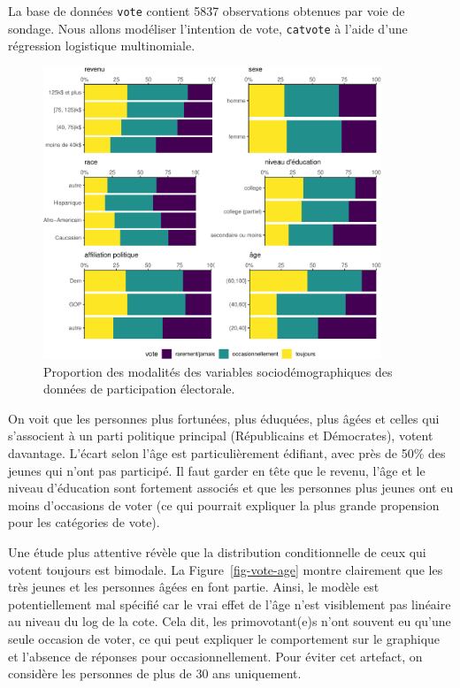 \documentclass[
  11pt,
  letterpaper,
]{scrbook}
\theoremstyle{definition}
\theoremstyle{remark}
\begin{document}
La base de données \texttt{vote} contient 5837 observations obtenues par
voie de sondage. Nous allons modéliser l'intention de vote,
\texttt{catvote} à l'aide d'une régression logistique multinomiale.

\begin{figure}[ht!]

{\centering \includegraphics[width=0.9\textwidth,height=\textheight]{./05-reglogistique_files/figure-pdf/fig-multinom_means-Ipsos-1.pdf}

}

\caption{\label{fig-multinom_means-Ipsos}Proportion des modalités des
variables sociodémographiques des données de participation électorale.}

\end{figure}

On voit que les personnes plus fortunées, plus éduquées, plus âgées et
celles qui s'associent à un parti politique principal (Républicains et
Démocrates), votent davantage. L'écart selon l'âge est particulièrement
édifiant, avec près de 50\% des jeunes qui n'ont pas participé. Il faut
garder en tête que le revenu, l'âge et le niveau d'éducation sont
fortement associés et que les personnes plus jeunes ont eu moins
d'occasions de voter (ce qui pourrait expliquer la plus grande
propension pour les catégories de vote).

Une étude plus attentive révèle que la distribution conditionnelle de
ceux qui votent toujours est bimodale. La Figure~\ref{fig-vote-age}
montre clairement que les très jeunes et les personnes âgées en font
partie. Ainsi, le modèle est potentiellement mal spécifié car le vrai
effet de l'âge n'est visiblement pas linéaire au niveau du log de la
cote. Cela dit, les primovotant(e)s n'ont souvent eu qu'une seule
occasion de voter, ce qui peut expliquer le comportement sur le
graphique et l'absence de réponses pour occasionnellement. Pour éviter
cet artefact, on considère les personnes de plus de 30 ans uniquement.
\end{document}
